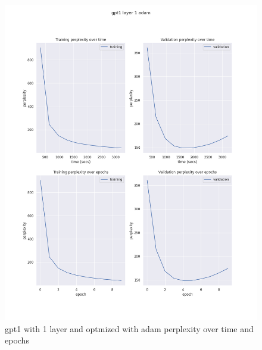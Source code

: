 \documentclass[12pt]{article}
\theoremstyle{definition}
\begin{document}
\begin{figure}[H]
     \centering
     \includegraphics[scale=0.4]{gpt1_layer_1_adam.png}
     \caption{gpt1 with 1 layer and optmized with adam perplexity over time and epochs}
\end{figure}
\end{document}
